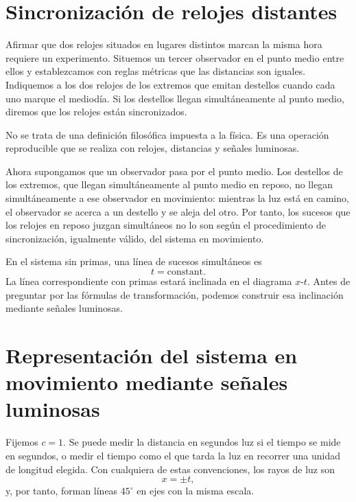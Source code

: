 \section{Sincronización de relojes distantes}

Afirmar que dos relojes situados en lugares distintos marcan la misma hora requiere un experimento. Situemos un tercer observador en el punto medio entre ellos y establezcamos con reglas métricas que las distancias son iguales. Indiquemos a los dos relojes de los extremos que emitan destellos cuando cada uno marque el mediodía. Si los destellos llegan simultáneamente al punto medio, diremos que los relojes están sincronizados.

No se trata de una definición filosófica impuesta a la física. Es una operación reproducible que se realiza con relojes, distancias y señales luminosas.

Ahora supongamos que un observador pasa por el punto medio. Los destellos de los extremos, que llegan simultáneamente al punto medio en reposo, no llegan simultáneamente a ese observador en movimiento: mientras la luz está en camino, el observador se acerca a un destello y se aleja del otro. Por tanto, los sucesos que los relojes en reposo juzgan simultáneos no lo son según el procedimiento de sincronización, igualmente válido, del sistema en movimiento.

En el sistema sin primas, una línea de sucesos simultáneos es
\begin{equation}
t=\text{constant}.
\end{equation}
La línea correspondiente con primas estará inclinada en el diagrama \(x\)-\(t\). Antes de preguntar por las fórmulas de transformación, podemos construir esa inclinación mediante señales luminosas.

\section{Representación del sistema en movimiento mediante señales luminosas}

Fijemos \(c=1\). Se puede medir la distancia en segundos luz si el tiempo se mide en segundos, o medir el tiempo como el que tarda la luz en recorrer una unidad de longitud elegida. Con cualquiera de estas convenciones, los rayos de luz son
\begin{equation}
x=\pm t,
\label{eq:sr1-light-units}
\end{equation}
y, por tanto, forman líneas \(45^\circ\) en ejes con la misma escala.

